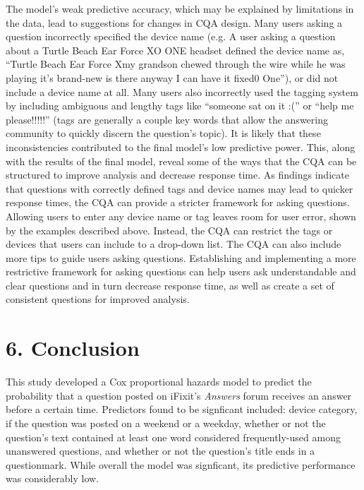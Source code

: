 \documentclass{article}
\begin{document}
The model's weak predictive accuracy, which may be explained by limitations in the data, lead to suggestions for changes in CQA design. Many users asking a question incorrectly specified the device name (e.g. A user asking a question about a Turtle Beach Ear Force XO ONE headset defined the device name as, ``Turtle Beach Ear Force Xmy grandson chewed through the wire while he was playing it's brand-new is there anyway I can have it fixed0 One''), or did not include a device name at all. Many users also incorrectly used the tagging system by including ambiguous and lengthy tags like ``someone sat on it :('' or ``help me please!!!!!'' (tags are generally a couple key words that allow the answering community to quickly discern the question's topic). It is likely that these inconsistencies contributed to the final model's low predictive power. This, along with the results of the final model, reveal some of the ways that the CQA can be structured to improve analysis and decrease response time. As findings indicate that questions with correctly defined tags and device names may lead to quicker response times, the CQA can provide a stricter framework for asking questions. Allowing users to enter any device name or tag leaves room for user error, shown by the examples described above. Instead, the CQA can restrict the tags or devices that users can include to a drop-down list. The CQA can also include more tips to guide users asking questions. Establishing and implementing a more restrictive framework for asking questions can help users ask understandable and clear questions and in turn decrease response time, as well as create a set of consistent questions for improved analysis. 


\section*{6. Conclusion}

This study developed a Cox proportional hazards model to predict the probability that a question posted on iFixit's \textit{Answers} forum receives an answer before a certain time. Predictors found to be signficant included: device category, if the question was posted on a weekend or a weekday, whether or not the question's text contained at least one word considered frequently-used among unanswered questions, and whether or not the question's title ends in a questionmark. While overall the model was signficant, its predictive performance was considerably low. 
\end{document}
